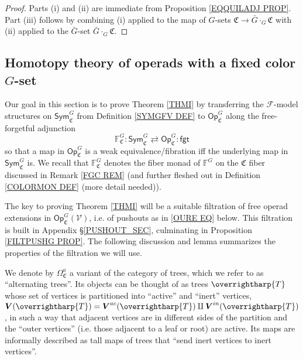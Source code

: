 \documentclass[a4paper,10pt
,draft
]{article}%
\numberwithin{equation}{section}
\numberwithin{figure}{section}
\theoremstyle{definition} %
\newcommand{\vect}[1]{\text{\overrightharp{\ensuremath{#1}}}}
\newcommand{\F}{\ensuremath{\mathcal F}}
\newcommand{\V}{\ensuremath{\mathcal V}}
\newcommand{\1}{\ensuremath{\mathbbm 1}}%
\begin{document}
\begin{proof}
	Parts (i) and (ii) are immediate from Proposition \ref{EQQUILADJ PROP}.
%	
	Part (iii) follows by combining (i) applied to 
	the map of $G$-sets $\mathfrak{C} \to \bar{G} \cdot_G \mathfrak{C}$
	with (ii) applied to the $\bar{G}$-set $\bar{G} \cdot_G \mathfrak{C}$.
\end{proof}




 
\subsection{Homotopy theory of operads with a fixed color $G$-set}
\label{OPC_MS_SEC}


Our goal in this section is to prove 
Theorem \ref{THMI} by transferring the $\F$-model structures on
$\mathsf{Sym}^G_{\mathfrak{C}}$
from Definition \ref{SYMGFV DEF}
to $\mathsf{Op}^G_{\mathfrak{C}}$
along the free-forgetful adjunction
\begin{equation}\label{OPAUTADJ EQ}
\mathbb{F}^G_{\mathfrak{C}} \colon
\mathsf{Sym}^G_{\mathfrak{C}}
\rightleftarrows
\mathsf{Op}^G_{\mathfrak{C}}
\colon \mathsf{fgt}
\end{equation}
so that a map in $\mathsf{Op}^G_{\mathfrak{C}}$
is a weak equivalence/fibration iff the underlying map in 
$\mathsf{Sym}^G_{\mathfrak{C}}$ is.
%
We recall that $\mathbb{F}^G_{\mathfrak{C}}$
denotes the fiber monad of $\mathbb{F}^G$ on the $\mathfrak{C}$ fiber
discussed in Remark \ref{FGC REM}
(and further fleshed out in {\color{red} Definition \ref{COLORMON DEF} (more detail needed)}).


The key to proving Theorem \ref{THMI} will be a suitable filtration of free operad extensions in $\mathsf{Op}_{\mathfrak{C}}^G(\V)$,
i.e. of pushouts as in \eqref{OURE EQ} below.
This filtration is built in Appendix \S \ref{PUSHOUT_SEC}, 
culminating in Proposition \ref{FILTPUSHG PROP}.
The following discussion and lemma summarizes the properties of the filtration we will use.


We denote by $\Omega^a_{\mathfrak{C}}$
a variant of the category of trees, 
which we refer to as ``alternating trees''.
Its objects can be thought of as trees $\vect{T}$ 
whose set of vertices is partitioned into ``active'' and ``inert'' vertices,
$\boldsymbol{V}(\vect T) = 
\boldsymbol{V}^{ac}(\vect T) \amalg \boldsymbol{V}^{in}(\vect T)$,
in such a way that adjacent vertices are in different sides of the partition and the ``outer vertices'' (i.e. those adjacent to a leaf or root) are active.
Its maps are informally described as tall maps of trees that 
``send inert vertices to inert vertices''.
\end{document}
